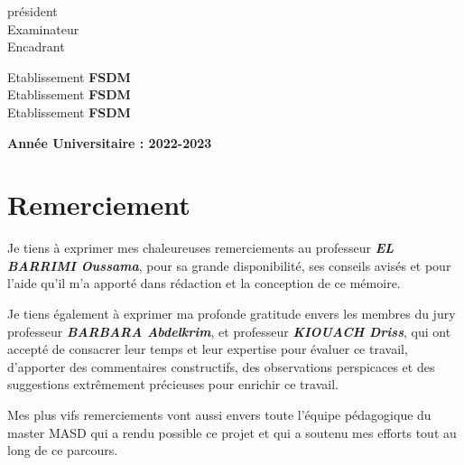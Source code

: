 \documentclass[A4paper,12pt]{report}
\begin{document}
\begin{titlepage}
\begin{minipage}{0.2\textwidth}
    \begin{flushleft}
    \textsf{ président}\\
    \textsf{ Examinateur}\\
    \textsf{ Encadrant}\\
    \end{flushleft}
\end{minipage}
\begin{minipage}{0.3\textwidth}
    \begin{flushleft}
      \textsf{Etablissement \textbf{ FSDM}}\\
      \textsf{Etablissement \textbf{ FSDM}}\\
      \textsf{Etablissement \textbf{ FSDM}}\\
    \end{flushleft}
\end{minipage}
	\vspace{2cm}
\begin{center}
\textcolor{blue!80!black}{\textbf{\textsf{ \large Ann\'ee Universitaire : 2022-2023}}}
\end{center}
\end{titlepage}


\chapter*{Remerciement}
Je tiens à exprimer mes chaleureuses remerciements au professeur \textbf{\textit{EL BARRIMI Oussama}}, pour sa grande disponibilité, ses conseils avisés et pour l'aide qu'il m'a apporté dans rédaction et la conception de ce mémoire.   

Je tiens également à exprimer ma profonde gratitude envers les membres du jury professeur \textbf{\textit{BARBARA Abdelkrim}}, et professeur \textbf{\textit{KIOUACH Driss}},  qui ont accepté de consacrer leur temps et leur expertise pour évaluer ce travail, d'apporter des commentaires constructifs, des observations perspicaces et des suggestions  extrêmement précieuses pour enrichir ce travail.

Mes plus vifs remerciements vont aussi envers toute l’équipe pédagogique du master MASD qui a rendu possible ce projet  et qui a soutenu mes efforts tout au long de ce parcours.


	
	
	
	
	
\end{document}

